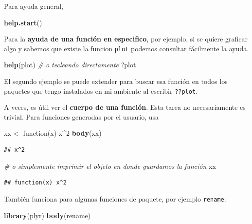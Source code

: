 \documentclass[]{article}
\newenvironment{Shaded}{\begin{snugshade}}{\end{snugshade}}
\newcommand{\KeywordTok}[1]{\textcolor[rgb]{0.13,0.29,0.53}{\textbf{{#1}}}}
\newcommand{\DecValTok}[1]{\textcolor[rgb]{0.00,0.00,0.81}{{#1}}}
\newcommand{\StringTok}[1]{\textcolor[rgb]{0.31,0.60,0.02}{{#1}}}
\newcommand{\CommentTok}[1]{\textcolor[rgb]{0.56,0.35,0.01}{\textit{{#1}}}}
\newcommand{\NormalTok}[1]{{#1}}
\begin{document}
Para ayuda general,

\begin{Shaded}
\begin{Highlighting}[]
\KeywordTok{help.start}\NormalTok{()}
\end{Highlighting}
\end{Shaded}

Para la \textbf{ayuda de una función en especifico}, por ejemplo, si se
quiere graficar algo y sabemos que existe la funcion \texttt{plot}
podemos consultar fácilmente la ayuda.

\begin{Shaded}
\begin{Highlighting}[]
\KeywordTok{help}\NormalTok{(plot)}
\CommentTok{# o tecleando directamente}
\NormalTok{?plot}
\end{Highlighting}
\end{Shaded}

El segundo ejemplo se puede extender para buscar esa función en todos
los paquetes que tengo instalados en mi ambiente al escribir
\texttt{??plot}.

A veces, es útil ver el \textbf{cuerpo de una función}. Esta tarea no
necesariamente es trivial. Para funciones generadas por el usuario, usa

\begin{Shaded}
\begin{Highlighting}[]
\NormalTok{xx <-}\StringTok{ }\NormalTok{function(x) x^}\DecValTok{2}
\KeywordTok{body}\NormalTok{(xx)}
\end{Highlighting}
\end{Shaded}

\begin{verbatim}
## x^2
\end{verbatim}

\begin{Shaded}
\begin{Highlighting}[]
\CommentTok{# o simplemente imprimir el objeto en donde guardamos la función}
\NormalTok{xx}
\end{Highlighting}
\end{Shaded}

\begin{verbatim}
## function(x) x^2
\end{verbatim}

También funciona para algunas funciones de paquete, por ejemplo
\texttt{rename}:

\begin{Shaded}
\begin{Highlighting}[]
\KeywordTok{library}\NormalTok{(plyr)}
\KeywordTok{body}\NormalTok{(rename)}
\end{Highlighting}
\end{Shaded}
\end{document}
